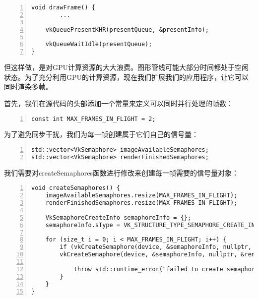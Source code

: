 \documentclass{ctexart}
\begin{document}
\begin{lstlisting}[language={[ANSI]C},keywordstyle=\color{blue!70},commentstyle=\color{red!50!green!50!blue!50},frame=shadowbox, rulesepcolor=\color{red!20!green!20!blue!20},basicstyle=\small,numbers=left, numberstyle=\tiny,breaklines=true]
void drawFrame() {
		...

	vkQueuePresentKHR(presentQueue, &presentInfo);

	vkQueueWaitIdle(presentQueue);
}
\end{lstlisting}

但这样做，是对GPU计算资源的大大浪费。图形管线可能大部分时间都处于空闲状态。为了充分利用GPU的计算资源，现在我们扩展我们的应用程序，让它可以同时渲染多帧。

首先，我们在源代码的头部添加一个常量来定义可以同时并行处理的帧数：

\begin{lstlisting}[language={[ANSI]C},keywordstyle=\color{blue!70},commentstyle=\color{red!50!green!50!blue!50},frame=shadowbox, rulesepcolor=\color{red!20!green!20!blue!20},basicstyle=\small,numbers=left, numberstyle=\tiny,breaklines=true]
const int MAX_FRAMES_IN_FLIGHT = 2;
\end{lstlisting}

为了避免同步干扰，我们为每一帧创建属于它们自己的信号量：

\begin{lstlisting}[language={[ANSI]C},keywordstyle=\color{blue!70},commentstyle=\color{red!50!green!50!blue!50},frame=shadowbox, rulesepcolor=\color{red!20!green!20!blue!20},basicstyle=\small,numbers=left, numberstyle=\tiny,breaklines=true]
std::vector<VkSemaphore> imageAvailableSemaphores;
std::vector<VkSemaphore> renderFinishedSemaphores;
\end{lstlisting}

我们需要对createSemaphores函数进行修改来创建每一帧需要的信号量对象：

\begin{lstlisting}[language={[ANSI]C},keywordstyle=\color{blue!70},commentstyle=\color{red!50!green!50!blue!50},frame=shadowbox, rulesepcolor=\color{red!20!green!20!blue!20},basicstyle=\small,numbers=left, numberstyle=\tiny,breaklines=true]
void createSemaphores() {
	imageAvailableSemaphores.resize(MAX_FRAMES_IN_FLIGHT);
	renderFinishedSemaphores.resize(MAX_FRAMES_IN_FLIGHT);

	VkSemaphoreCreateInfo semaphoreInfo = {};
	semaphoreInfo.sType = VK_STRUCTURE_TYPE_SEMAPHORE_CREATE_INFO;

	for (size_t i = 0; i < MAX_FRAMES_IN_FLIGHT; i++) {
		if (vkCreateSemaphore(device, &semaphoreInfo, nullptr, &imageAvailableSemaphores[i]) != VK_SUCCESS ||
		vkCreateSemaphore(device, &semaphoreInfo, nullptr, &renderFinishedSemaphores[i]) != VK_SUCCESS) {

			throw std::runtime_error("failed to create semaphores for a frame!");
		}
	}
}
\end{lstlisting}
\end{document}
